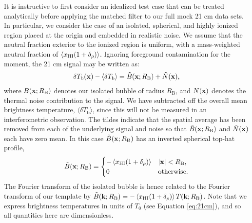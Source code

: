 It is instructive to first consider an idealized test case that can be
treated analytically before applying the matched filter to our
full mock 21 cm data sets. In particular, we consider the
case of an isolated, spherical, and highly ionized region placed at the
origin and embedded in
realistic noise. We assume that the neutral fraction exterior
to the ionized region is uniform, with a mass-weighted neutral fraction
of $\langle x_{\rm HI} (1 + \delta_\rho)\rangle$. Ignoring foreground contamination
for the moment, the 21 cm signal may be written as: 
\begin{equation}
\delta T_{\text{b}}({\bf x}) - \langle \delta T_{\text{b}} \rangle = \tilde{B}({\bf x};R_{\text{B}}) +
\tilde{N}({\bf x}),
\end{equation}
where $B({\bf x};R_{\text{B}})$ denotes our isolated bubble of radius
$R_{\text{B}}$,
and $N({\bf x})$ denotes the thermal noise contribution to the
signal. We have subtracted off the overall mean brightness temperature, $\langle \delta T_{\text{b}}\rangle$,
since this will not be measured in an interferometric observation. The tildes indicate
that the spatial average has been removed from each of the underlying signal and noise so
that $\tilde{B}({\bf x};R_{\text{B}})$ and $\tilde{N}({\bf x})$ each have zero mean. In
this case $\tilde{B}({\bf x};R_{\text{B}})$ has an inverted spherical top-hat profile,
\begin{equation}
\tilde{B}({\bf x};R_{\text{B}}) = \begin{cases} -\left\langle
  x_{\text{HI}}(1+\delta_{\rho}) \right\rangle   &\text{$|{\bf x}| <
    R_{\text{B}}$,} \\ 0  &\text{otherwise.}
\end{cases}
\label{eq:Btilde}
\end{equation}
The Fourier
transform of the isolated bubble is hence related to the Fourier transform of our
template by $\tilde{B}({\bf k};R_{\text{B}}) = -\left\langle
x_{\text{HI}}(1+\delta_\rho) \right\rangle T({\bf k};R_{\text{B}})$. Note that we express brightness temperatures
in units of $T_0$ (see Equation \ref{eq:21cm}), and so all quantities here are dimensionless.

